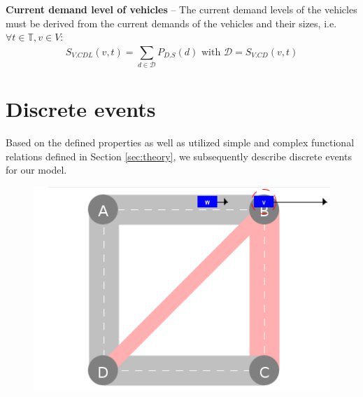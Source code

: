 \documentclass[graybox]{svmult}
\begin{document}
\vspace{2mm}
\noindent
\textbf{Current demand level of vehicles}
--
The current demand levels of the vehicles must be derived from the current demands of the vehicles and their sizes, i.e.\ $\forall t \in \mathbb{T}, v \in V:$
\[
S_{V.CDL}(v,t)=\sum_{d \in \mathcal{D}}^{}P_{D.S}(d) \textrm{ with } \mathcal{D}=S_{V.CD}(v,t)
\]

\section{Discrete events}
\label{sec:events}
Based on the defined properties as well as utilized simple and complex functional relations defined in Section \ref{sec:theory}, we subsequently describe discrete events for our model.
\vspace{4mm}
\begin{figure}
	\centering
		\includegraphics[scale=0.35]{../../events/vehicle-at-intersection-before.png}
\end{figure}
\end{document}
